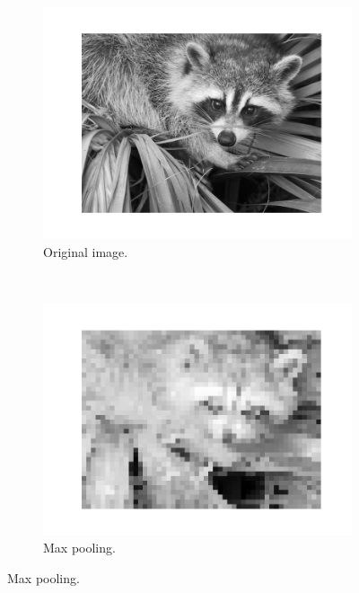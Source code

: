         \begin{figure}[!ht]
            \centering
            \begin{subfigure}[t]{0.5\textwidth}
                \centering
                \includegraphics[width=\textwidth]{images/face.png}
                \caption{Original image.}
                \label{fig:pooling-face-original}
            \end{subfigure}%
            ~
            \begin{subfigure}[t]{0.5\textwidth}
                \centering
                \includegraphics[width=\textwidth]{images/face_max_pooled.png}
                \caption{Max pooling.}
                \label{fig:pooling-face-max}
            \end{subfigure}

\end{figure}
